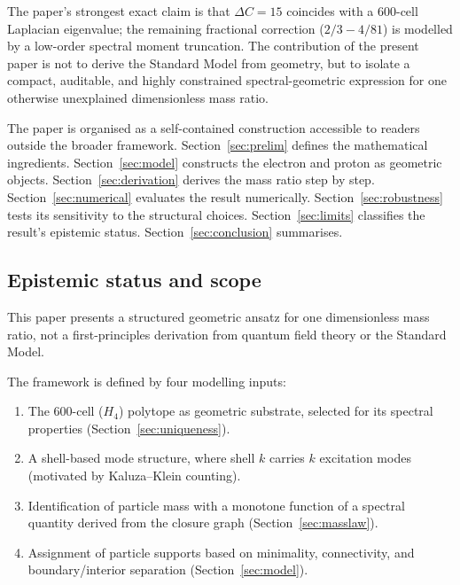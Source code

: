 \documentclass[12pt]{article}
\begin{document}
The paper's strongest exact claim is that $\Delta C = 15$ coincides with a 600-cell Laplacian eigenvalue; the remaining fractional correction ($2/3 - 4/81$) is modelled by a low-order spectral moment truncation. The contribution of the present paper is not to derive the Standard Model from geometry, but to isolate a compact, auditable, and highly constrained spectral-geometric expression for one otherwise unexplained dimensionless mass ratio.

The paper is organised as a self-contained construction accessible to readers outside the broader framework. Section~\ref{sec:prelim} defines the mathematical ingredients. Section~\ref{sec:model} constructs the electron and proton as geometric objects. Section~\ref{sec:derivation} derives the mass ratio step by step. Section~\ref{sec:numerical} evaluates the result numerically. Section~\ref{sec:robustness} tests its sensitivity to the structural choices. Section~\ref{sec:limits} classifies the result's epistemic status. Section~\ref{sec:conclusion} summarises.

\subsection*{Epistemic status and scope}\label{sec:epistemic}

This paper presents a structured geometric ansatz for one dimensionless mass ratio, not a first-principles derivation from quantum field theory or the Standard Model.

The framework is defined by four modelling inputs:
\begin{enumerate}
    \item The 600-cell ($H_4$) polytope as geometric substrate, selected for its spectral properties (Section~\ref{sec:uniqueness}).
    \item A shell-based mode structure, where shell $k$ carries $k$ excitation modes (motivated by Kaluza--Klein counting).
    \item Identification of particle mass with a monotone function of a spectral quantity derived from the closure graph (Section~\ref{sec:masslaw}).
    \item Assignment of particle supports based on minimality, connectivity, and boundary/interior separation (Section~\ref{sec:model}).
\end{enumerate}
\end{document}
